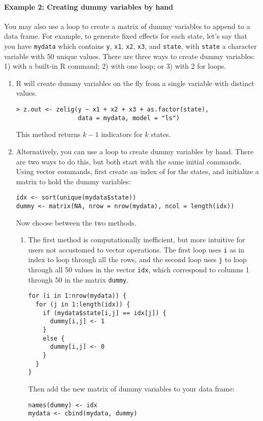 \paragraph{Example 2: Creating dummy variables by hand}  

\label{dummy}You may also use a loop to create a matrix of dummy
variables to append to a data frame.  For example, to generate fixed
effects for each state, let's say that you have {\tt mydata} which
contains {\tt y}, {\tt x1}, {\tt x2}, {\tt x3}, and {\tt state}, with
{\tt state} a character variable with 50 unique values.  There are
three ways to create dummy variables: 1) with a built-in R command; 2)
with one loop; or 3) with 2 for loops.  
\begin{enumerate}
\item R will create dummy variables on the fly from a single variable
with distinct values.  
\begin{verbatim}
> z.out <- zelig(y ~ x1 + x2 + x3 + as.factor(state), 
                 data = mydata, model = "ls")
\end{verbatim}
This method returns $k - 1$ indicators for $k$ states.  

\item Alternatively, you can use a loop to create dummy variables by
hand.  There are two ways to do this, but both start with the same
initial commands. Using vector commands, first create an index of for
the states, and initialize a matrix to hold the dummy variables:
\begin{verbatim}  
idx <- sort(unique(mydata$state))
dummy <- matrix(NA, nrow = nrow(mydata), ncol = length(idx))
\end{verbatim}  %
Now choose between the two methods.  
\begin{enumerate}
\item The first method is computationally inefficient, but more intuitive for users not
accustomed to vector operations.  The first loop uses {\tt i} as in
index to loop through all the rows, and the second loop uses {\tt j}
to loop through all 50 values in the vector {\tt idx}, which
correspond to columns 1 through 50 in the matrix {\tt dummy}.
\begin{verbatim}
for (i in 1:nrow(mydata)) {
  for (j in 1:length(idx)) {
    if (mydata$state[i,j] == idx[j]) {
      dummy[i,j] <- 1
    }
    else {
      dummy[i,j] <- 0
    }
  }
}
\end{verbatim}  %
Then add the new matrix of dummy variables to your data frame:
\begin{verbatim}
names(dummy) <- idx
mydata <- cbind(mydata, dummy) 
\end{verbatim}  


\end{enumerate}
\end{enumerate}
